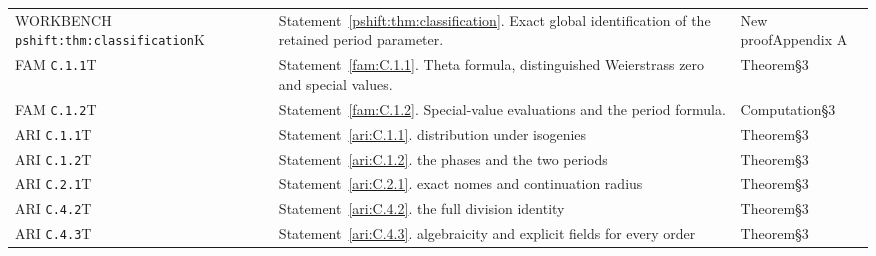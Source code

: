 \documentclass[11pt,a4paper]{article}
\theoremstyle{plain}
\theoremstyle{definition}
\begin{document}
\begin{longtable}{@{}L{.18\linewidth}L{.48\linewidth}L{.29\linewidth}@{}}
WORKBENCH \nolinkurl{pshift:thm:classification}\newline K & Statement~\ref{pshift:thm:classification}. Exact global identification of the retained period parameter.\newline {} & New proof\newline Appendix A\\
FAM \nolinkurl{C.1.1}\newline T & Statement~\ref{fam:C.1.1}. Theta formula, distinguished Weierstrass zero and special values.\newline {} & Theorem\newline §3\\
FAM \nolinkurl{C.1.2}\newline T & Statement~\ref{fam:C.1.2}. Special-value evaluations and the period formula.\newline {} & Computation\newline §3\\
ARI \nolinkurl{C.1.1}\newline T & Statement~\ref{ari:C.1.1}. distribution under isogenies\newline {} & Theorem\newline §3\\
ARI \nolinkurl{C.1.2}\newline T & Statement~\ref{ari:C.1.2}. the phases and the two periods\newline {} & Theorem\newline §3\\
ARI \nolinkurl{C.2.1}\newline T & Statement~\ref{ari:C.2.1}. exact nomes and continuation radius\newline {} & Theorem\newline §3\\
ARI \nolinkurl{C.4.2}\newline T & Statement~\ref{ari:C.4.2}. the full division identity\newline {} & Theorem\newline §3\\
ARI \nolinkurl{C.4.3}\newline T & Statement~\ref{ari:C.4.3}. algebraicity and explicit fields for every order\newline {} & Theorem\newline §3\\

\end{longtable}
\end{document}
